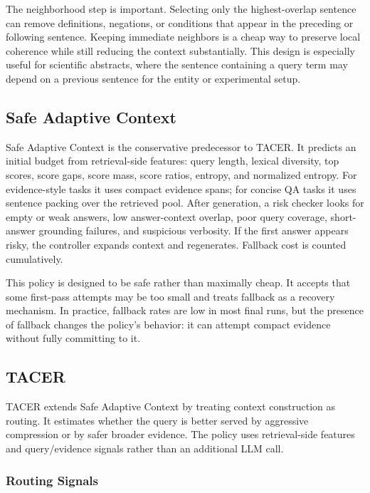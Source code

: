 \documentclass[11pt]{article}
\begin{document}
The neighborhood step is important. Selecting only the highest-overlap sentence can remove definitions, negations, or conditions that appear in the preceding or following sentence. Keeping immediate neighbors is a cheap way to preserve local coherence while still reducing the context substantially. This design is especially useful for scientific abstracts, where the sentence containing a query term may depend on a previous sentence for the entity or experimental setup.

\subsection{Safe Adaptive Context}

Safe Adaptive Context is the conservative predecessor to TACER. It predicts an initial budget from retrieval-side features: query length, lexical diversity, top scores, score gaps, score mass, score ratios, entropy, and normalized entropy. For evidence-style tasks it uses compact evidence spans; for concise QA tasks it uses sentence packing over the retrieved pool. After generation, a risk checker looks for empty or weak answers, low answer-context overlap, poor query coverage, short-answer grounding failures, and suspicious verbosity. If the first answer appears risky, the controller expands context and regenerates. Fallback cost is counted cumulatively.

This policy is designed to be safe rather than maximally cheap. It accepts that some first-pass attempts may be too small and treats fallback as a recovery mechanism. In practice, fallback rates are low in most final runs, but the presence of fallback changes the policy's behavior: it can attempt compact evidence without fully committing to it.

\subsection{TACER}

TACER extends Safe Adaptive Context by treating context construction as routing. It estimates whether the query is better served by aggressive compression or by safer broader evidence. The policy uses retrieval-side features and query/evidence signals rather than an additional LLM call.

\subsubsection{Routing Signals}
\end{document}
